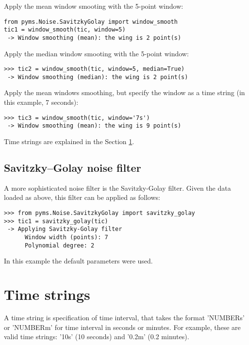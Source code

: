 Apply the mean window smooting with the 5-point window:

\begin{verbatim}
from pyms.Noise.SavitzkyGolay import window_smooth
tic1 = window_smooth(tic, window=5)
 -> Window smoothing (mean): the wing is 2 point(s)
\end{verbatim}

Apply the median window smooting with the 5-point window:

\begin{verbatim}
>>> tic2 = window_smooth(tic, window=5, median=True)
 -> Window smoothing (median): the wing is 2 point(s)
\end{verbatim}

Apply the mean windows smoothing, but specify the window as
a time string (in this example, 7 seconds):

\begin{verbatim}
>>> tic3 = window_smooth(tic, window='7s')
 -> Window smoothing (mean): the wing is 9 point(s)
\end{verbatim}

Time strings are explained in the Section \ref{sec:time-string}.

\subsection{Savitzky--Golay noise filter}


A more sophisticated noise filter is the Savitzky-Golay filter.
Given the data loaded as above, this filter can be applied as
follows:

\begin{verbatim}
>>> from pyms.Noise.SavitzkyGolay import savitzky_golay
>>> tic1 = savitzky_golay(tic)
 -> Applying Savitzky-Golay filter
      Window width (points): 7
      Polynomial degree: 2
\end{verbatim}

In this example the default parameters were used.

\section{Time strings}
\label{sec:time-string}

A time string is specification of time interval, that takes the format
'NUMBERs' or 'NUMBERm' for time interval in seconds or minutes. For
example, these are valid time strings: '10s' (10 seconds) and '0.2m'
(0.2 minutes).

